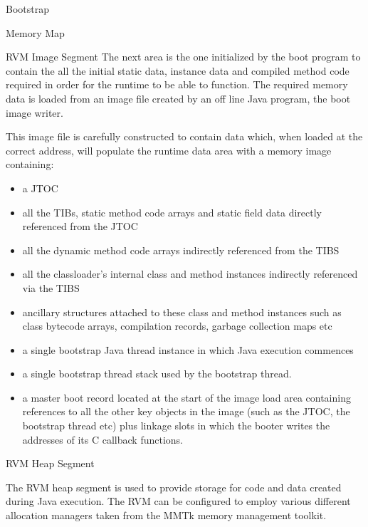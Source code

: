 \begin{section}{Bootstrap}
\begin{subsection}{Memory Map}
\begin{subsubsection}{RVM Image Segment}
The next area is the one initialized by the boot program to contain the all the initial static data, instance data and compiled method code required in order for the runtime to be able to function. The required memory data is loaded from an image file created by an off line Java program, the boot image writer.

This image file is carefully constructed to contain data which, when loaded at the correct address, will populate the runtime data area with a memory image containing:

\begin{itemize}
  \item a JTOC
  \item all the TIBs, static method code arrays and static field data directly referenced from the JTOC
  \item all the dynamic method code arrays indirectly referenced from the TIBS
  \item all the classloader's internal class and method instances indirectly referenced via the TIBS
  \item ancillary structures attached to these class and method instances such as class bytecode arrays, compilation records, garbage collection maps etc
  \item a single bootstrap Java thread instance in which Java execution commences
  \item a single bootstrap thread stack used by the bootstrap thread.
  \item a master boot record located at the start of the image load area containing references to all the other key objects in the image (such as the JTOC, the bootstrap thread etc) plus linkage slots in which the booter writes the addresses of its C callback functions.
\end{itemize}

\end{subsubsection}

\begin{subsubsection}{RVM Heap Segment}

The RVM heap segment is used to provide storage for code and data created during Java execution. The RVM can be configured to employ various different allocation managers taken from the MMTk memory management toolkit.

\end{subsubsection}

\end{subsection}

\end{section}
